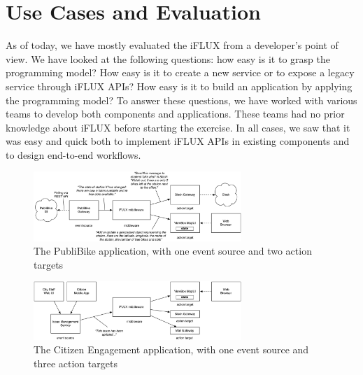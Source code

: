 
\section{Use Cases and Evaluation}

As of today, we have mostly evaluated the iFLUX from a developer's point of view. We have looked at the following questions: how easy is it to grasp the programming model? How easy is it to create a new service or to expose a legacy service through iFLUX APIs? How easy is it to build an application by applying the programming model? To answer these questions, we have worked with various teams to develop both components and applications. These teams had no prior knowledge about iFLUX before starting the exercise. In all cases, we saw that it was easy and quick both to implement iFLUX APIs in existing components and to design end-to-end workflows.

\begin{figure}
\centering
\includegraphics[width=0.7\textwidth]{figures/publibike.pdf}
\caption{The PubliBike application, with one event source and two action targets}
\label{fig:publibike}
\end{figure}

\begin{figure}
\centering
\includegraphics[width=0.7\textwidth]{figures/citizen}
\caption{The Citizen Engagement application, with one event source and three action targets}
\label{fig:citizen}
\end{figure}




